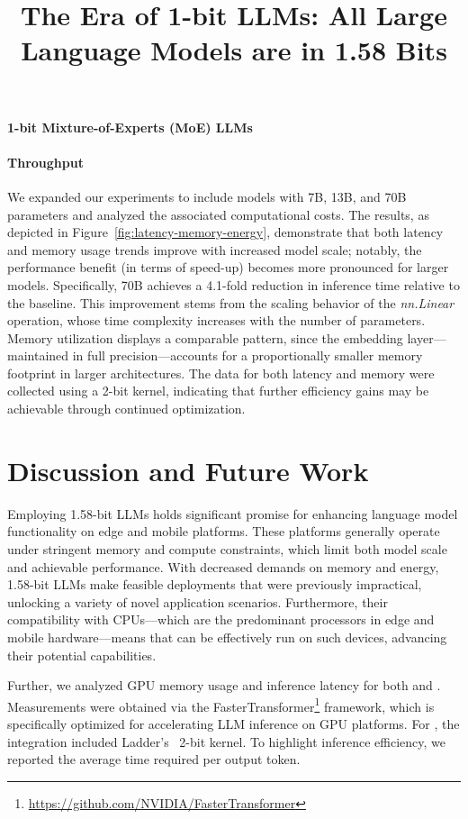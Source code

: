 \title{The Era of 1-bit LLMs: All Large Language Models are in 1.58 Bits}
\textbf{1-bit Mixture-of-Experts (MoE) LLMs}

\paragraph{Throughput}

We expanded our experiments to include models with 7B, 13B, and 70B parameters and analyzed the associated computational costs. The results, as depicted in Figure~\ref{fig:latency-memory-energy}, demonstrate that both latency and memory usage trends improve with increased model scale; notably, the performance benefit (in terms of speed-up) becomes more pronounced for larger models. Specifically,  70B achieves a 4.1-fold reduction in inference time relative to the  baseline. This improvement stems from the scaling behavior of the \emph{nn.Linear} operation, whose time complexity increases with the number of parameters. Memory utilization displays a comparable pattern, since the embedding layer—maintained in full precision—accounts for a proportionally smaller memory footprint in larger architectures. The data for both latency and memory were collected using a 2-bit kernel, indicating that further efficiency gains may be achievable through continued optimization.

\section{Discussion and Future Work}

Employing 1.58-bit LLMs holds significant promise for enhancing language model functionality on edge and mobile platforms. These platforms generally operate under stringent memory and compute constraints, which limit both model scale and achievable performance. With decreased demands on memory and energy, 1.58-bit LLMs make feasible deployments that were previously impractical, unlocking a variety of novel application scenarios. Furthermore, their compatibility with CPUs—which are the predominant processors in edge and mobile hardware—means that  can be effectively run on such devices, advancing their potential capabilities.

Further, we analyzed GPU memory usage and inference latency for both  and . Measurements were obtained via the FasterTransformer\footnote{\url{https://github.com/NVIDIA/FasterTransformer}} framework, which is specifically optimized for accelerating LLM inference on GPU platforms. For , the integration included Ladder's~\cite{ladder} 2-bit kernel. To highlight inference efficiency, we reported the average time required per output token.

